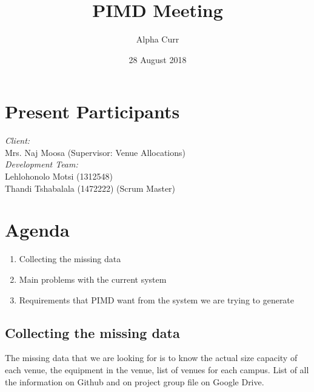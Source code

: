 \documentclass[11pt]{article}
\title{PIMD Meeting}
\author{Alpha Curr}
\date{28 August 2018}
\begin{document}
\maketitle

\section{Present Participants}
\textit{Client:}\\
Mrs. Naj Moosa (Supervisor: Venue Allocations)\\
\newline
\textit{Development Team:}\\
Lehlohonolo Motsi (1312548)\\
Thandi Tshabalala (1472222) (Scrum Master)

\section{Agenda}
\begin{enumerate}
\item Collecting the missing data
\item Main problems with the current system
\item Requirements that PIMD want from the system we are trying to generate
\end{enumerate}


\subsection{Collecting the missing data}
The missing data that we are looking for is to know the actual size capacity of each venue, the equipment in the venue, list of venues for each campus. List of all the information on Github and on project group file on Google Drive.
\end{document}
